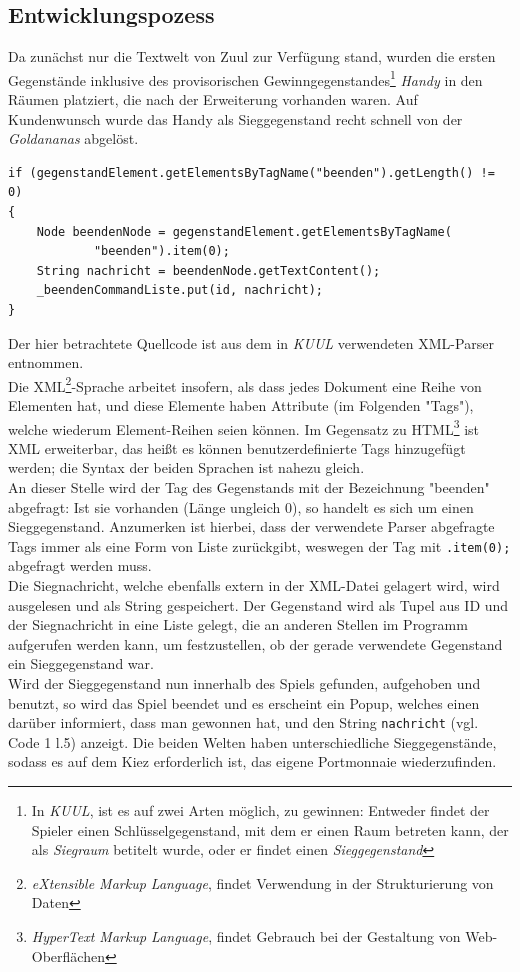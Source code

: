 \documentclass[12pt,twoside]{article}
\theoremstyle{plain}
\theoremstyle{definition}
\theoremstyle{remark}
\begin{document}
\subsection{Entwicklungspozess}
\label{ssec:main_dev}
Da zunächst nur die Textwelt von Zuul zur Verfügung stand, wurden die ersten Gegenstände inklusive des provisorischen Gewinngegenstandes\footnote{In \textit{KUUL}, ist es auf zwei Arten möglich, zu gewinnen: Entweder findet der Spieler einen Schlüsselgegenstand, mit dem er einen Raum betreten kann, der als \textit{Siegraum} betitelt wurde, oder er findet einen \textit{Sieggegenstand}} \textit{Handy} in den Räumen platziert, die nach der Erweiterung vorhanden waren.
Auf Kundenwunsch wurde das Handy als Sieggegenstand recht schnell von der \textit{Goldananas} abgelöst.
\begin{lstlisting}[caption=Auszug aus dem XML-Parser für Gegenstände, label=code:main_parser]
if (gegenstandElement.getElementsByTagName("beenden").getLength() != 0)
{
	Node beendenNode = gegenstandElement.getElementsByTagName(
			"beenden").item(0);
	String nachricht = beendenNode.getTextContent();
	_beendenCommandListe.put(id, nachricht);
}
\end{lstlisting}
Der hier betrachtete Quellcode ist aus dem in \textit{KUUL} verwendeten XML-Parser entnommen.\\
Die XML\footnote{\textit{eXtensible Markup Language}, findet Verwendung in der Strukturierung von Daten}-Sprache arbeitet insofern, als dass jedes Dokument eine Reihe von Elementen hat, und diese Elemente haben Attribute (im Folgenden "Tags"), welche wiederum Element-Reihen seien können.
Im Gegensatz zu HTML\footnote{\textit{HyperText Markup Language}, findet Gebrauch bei der Gestaltung von Web-Oberflächen} ist XML erweiterbar, das heißt es können benutzerdefinierte Tags hinzugefügt werden; die Syntax der beiden Sprachen ist nahezu gleich.\\
An dieser Stelle wird der Tag des Gegenstands mit der Bezeichnung "beenden\string" abgefragt: Ist sie vorhanden (Länge ungleich 0), so handelt es sich um einen Sieggegenstand.
Anzumerken ist hierbei, dass der verwendete Parser abgefragte Tags immer als eine Form von Liste zurückgibt, weswegen der Tag mit \texttt{.item(0);} abgefragt werden muss.\\
Die Siegnachricht, welche ebenfalls extern in der XML-Datei gelagert wird, wird ausgelesen und als String gespeichert.
Der Gegenstand wird als Tupel aus ID und der Siegnachricht in eine Liste gelegt, die an anderen Stellen im Programm aufgerufen werden kann, um festzustellen, ob der gerade verwendete Gegenstand ein Sieggegenstand war.\\
Wird der Sieggegenstand nun innerhalb des Spiels gefunden, aufgehoben und benutzt, so wird das Spiel beendet und es erscheint ein Popup, welches einen darüber informiert, dass man gewonnen hat, und den String \texttt{nachricht} (vgl. Code 1 l.5) anzeigt.
Die beiden Welten haben unterschiedliche Sieggegenstände, sodass es auf dem Kiez erforderlich ist, das eigene Portmonnaie wiederzufinden.
\end{document}
